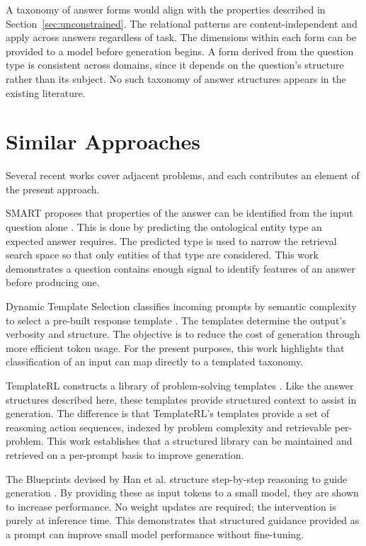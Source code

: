 \documentclass[master]{thesis}
\newcommand{\sref}[1]{Section~\ref{#1}}  %
\begin{document}
A taxonomy of answer forms would align with the properties described in \sref{sec:unconstrained}. The relational patterns are content-independent and apply across answers regardless of task. The dimensions within each form can be provided to a model before generation begins. A form derived from the question type is consistent across domains, since it depends on the question's structure rather than its subject. No such taxonomy of answer structures appears in the existing literature.

\section{Similar Approaches}

Several recent works cover adjacent problems, and each contributes an element of the present approach.

SMART proposes that properties of the answer can be identified from the input question alone \cite{setty2023smart, smart2021}. This is done by predicting the ontological entity type an expected answer requires. The predicted type is used to narrow the retrieval search space so that only entities of that type are considered. This work demonstrates a question contains enough signal to identify features of an answer before producing one.

Dynamic Template Selection classifies incoming prompts by semantic complexity to select a pre-built response template \cite{yadavalli2025dts}. The templates determine the output's verbosity and structure. The objective is to reduce the cost of generation through more efficient token usage. For the present purposes, this work highlights that classification of an input can map directly to a templated taxonomy.

TemplateRL constructs a library of problem-solving templates \cite{wu2025templaterl}. Like the answer structures described here, these templates provide structured context to assist in generation. The difference is that TemplateRL's templates provide a set of reasoning action sequences, indexed by problem complexity and retrievable per-problem. This work establishes that a structured library can be maintained and retrieved on a per-prompt basis to improve generation.

The Blueprints devised by Han et al. structure step-by-step reasoning to guide generation \cite{han2025blueprints}. By providing these as input tokens to a small model, they are shown to increase performance. No weight updates are required; the intervention is purely at inference time. This demonstrates that structured guidance provided as a prompt can improve small model performance without fine-tuning.
\end{document}
